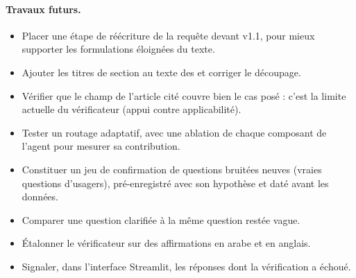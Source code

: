 \paragraph{Travaux futurs.}
\begin{itemize}
  \item Placer une étape de réécriture de la requête devant v1.1, pour mieux supporter les formulations éloignées du texte.
  \item Ajouter les titres de section au texte des  et corriger le découpage.
  \item Vérifier que le champ de l'article cité couvre bien le cas posé : c'est la limite actuelle du vérificateur (appui contre applicabilité).
  \item Tester un routage adaptatif, avec une ablation de chaque composant de l'agent pour mesurer sa contribution.
  \item Constituer un jeu de confirmation de questions bruitées neuves (vraies questions d'usagers), pré-enregistré avec son hypothèse et daté avant les données.
  \item Comparer une question clarifiée à la même question restée vague.
  \item Étalonner le vérificateur sur des affirmations en arabe et en anglais.
  \item Signaler, dans l'interface Streamlit, les réponses dont la vérification a échoué.
\end{itemize}
